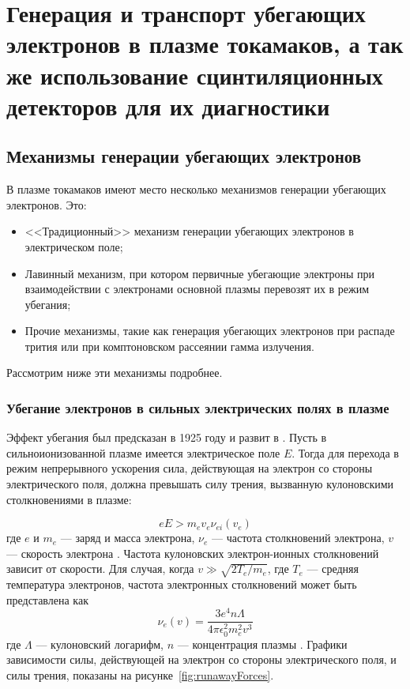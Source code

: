 \chapter{Генерация и транспорт убегающих электронов в плазме токамаков, а так же использование сцинтиляционных детекторов для их диагностики}\label{ch:ch1}

\section{Механизмы генерации убегающих электронов}\label{sec:ch1/sec1}

В плазме токамаков имеют место несколько механизмов генерации убегающих электронов. Это:

\begin{itemize}
  \item <<Традиционный>> механизм генерации убегающих электронов в электрическом поле;
  \item Лавинный механизм, при котором первичные убегающие электроны при взаимодействии с электронами основной плазмы перевозят их в режим убегания;
  \item Прочие механизмы, такие как генерация убегающих электронов при распаде трития или при комптоновском рассеянии гамма излучения.
\end{itemize}

Рассмотрим ниже эти механизмы подробнее.

\subsection{Убегание электронов в сильных электрических полях в плазме}

Эффект убегания был предсказан в 1925 году \cite{Wilson1925} и развит в \cite{Dreicer1959}. Пусть в сильноионизованной плазме имеется электрическое поле $E$. Тогда для перехода в режим непрерывного ускорения сила, действующая на электрон со стороны электрического поля, должна превышать силу трения, вызванную кулоновскими столкновениями в плазме:

\begin{equation}
  \label{eq:runawayEq}
  e E >  m_e v_e \nu_{ei}(v_e)
\end{equation}
где $e$ и $m_e$ --- заряд и масса электрона, $\nu_{e}$ --- частота столкновений электрона, $v$ --- скорость электрона \cite{Wesson2004}. Частота кулоновских электрон-ионных столкновений зависит от скорости. Для случая, когда $v \gg \sqrt{ 2 T_e / m_e }$, где $T_e$ --- средняя температура электронов, частота электронных столкновений может быть представлена как 
\begin{equation*}
  \nu_{e}(v) = \frac{ 3 e^4 n \Lambda }{ 4 \pi \epsilon_0^2 m_e^2 v^3 }
\end{equation*} 
где $\Lambda$ --- кулоновский логарифм, $n$ --- концентрация плазмы \cite{Wesson2004}. Графики зависимости силы, действующей на электрон со стороны электрического поля, и силы трения, показаны на рисунке~\ref{fig:runawayForces}.

